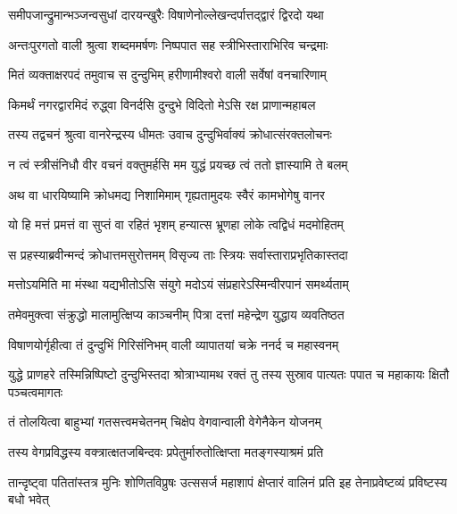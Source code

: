 \twolineshloka
{समीपजान्द्रुमान्भञ्जन्वसुधां दारयन्खुरैः}
{विषाणेनोल्लेखन्दर्पात्तद्द्वारं द्विरदो यथा} %

\twolineshloka
{अन्तःपुरगतो वाली श्रुत्वा शब्दममर्षणः}
{निष्पपात सह स्त्रीभिस्ताराभिरिव चन्द्रमाः} %

\twolineshloka
{मितं व्यक्ताक्षरपदं तमुवाच स दुन्दुभिम्}
{हरीणामीश्वरो वाली सर्वेषां वनचारिणाम्} %

\twolineshloka
{किमर्थं नगरद्वारमिदं रुद्ध्वा विनर्दसि}
{दुन्दुभे विदितो मेऽसि रक्ष प्राणान्महाबल} %

\twolineshloka
{तस्य तद्वचनं श्रुत्वा वानरेन्द्रस्य धीमतः}
{उवाच दुन्दुभिर्वाक्यं क्रोधात्संरक्तलोचनः} %

\twolineshloka
{न त्वं स्त्रीसंनिधौ वीर वचनं वक्तुमर्हसि}
{मम युद्धं प्रयच्छ त्वं ततो ज्ञास्यामि ते बलम्} %

\twolineshloka
{अथ वा धारयिष्यामि क्रोधमद्य निशामिमाम्}
{गृह्यतामुदयः स्वैरं कामभोगेषु वानर} %

\twolineshloka
{यो हि मत्तं प्रमत्तं वा सुप्तं वा रहितं भृशम्}
{हन्यात्स भ्रूणहा लोके त्वद्विधं मदमोहितम्} %

\twolineshloka
{स प्रहस्याब्रवीन्मन्दं क्रोधात्तमसुरोत्तमम्}
{विसृज्य ताः स्त्रियः सर्वास्ताराप्रभृतिकास्तदा} %

\twolineshloka
{मत्तोऽयमिति मा मंस्था यद्यभीतोऽसि संयुगे}
{मदोऽयं संप्रहारेऽस्मिन्वीरपानं समर्थ्यताम्} %

\twolineshloka
{तमेवमुक्त्वा संक्रुद्धो मालामुत्क्षिप्य काञ्चनीम्}
{पित्रा दत्तां महेन्द्रेण युद्धाय व्यवतिष्ठत} %

\twolineshloka
{विषाणयोर्गृहीत्वा तं दुन्दुभिं गिरिसंनिभम्}
{वाली व्यापातयां चक्रे ननर्द च महास्वनम्} %

\threelineshloka
{युद्धे प्राणहरे तस्मिन्निष्पिष्टो दुन्दुभिस्तदा}
{श्रोत्राभ्यामथ रक्तं तु तस्य सुस्राव पात्यतः}
{पपात च महाकायः क्षितौ पञ्चत्वमागतः} %

\twolineshloka
{तं तोलयित्वा बाहुभ्यां गतसत्त्वमचेतनम्}
{चिक्षेप वेगवान्वाली वेगेनैकेन योजनम्} %

\twolineshloka
{तस्य वेगप्रविद्धस्य वक्त्रात्क्षतजबिन्दवः}
{प्रपेतुर्मारुतोत्क्षिप्ता मतङ्गस्याश्रमं प्रति} %

\threelineshloka
{तान्दृष्ट्वा पतितांस्तत्र मुनिः शोणितविप्रुषः}
{उत्ससर्ज महाशापं क्षेप्तारं वालिनं प्रति}
{इह तेनाप्रवेष्टव्यं प्रविष्टस्य बधो भवेत्} %

